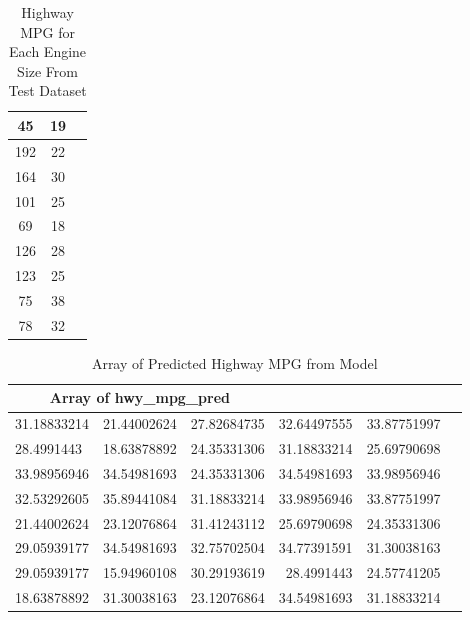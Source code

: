 \begin{table}[htb]
\begin{tabular}{|c|c| p{5cm}|}
     45  & 19 \\ \hline
     192 & 22 \\ \hline
     164 & 30 \\ \hline
     101 & 25 \\ \hline
     69  & 18 \\ \hline
     126 & 28 \\ \hline
     123 & 25 \\ \hline
     75  & 38 \\ \hline
     78  & 32 \\ \hline
   \end{tabular}  
   \caption{Highway MPG for Each Engine Size From Test Dataset} 
   \label{tab:TestSetMPG}
\end{table}


\begin{table}[htb]
    \centering
    \begin{tabular}{llcrr p{8cm}}
    \hline
    \midrule
    \multicolumn{3}{c}{Array of hwy\_mpg\_pred}\\ \hline
  31.18833214 & 21.44002624 & 27.82684735 & 32.64497555 &  33.87751997 \\						
  28.4991443  &  18.63878892 & 24.35331306 & 31.18833214 & 25.69790698 \\						
  33.98956946 & 34.54981693 & 24.35331306 &  34.54981693 & 33.98956946 \\						
  32.53292605 & 35.89441084 & 31.18833214 &  33.98956946 & 33.87751997 \\						
  21.44002624 & 23.12076864 & 31.41243112 & 25.69790698 & 24.35331306 \\						
  29.05939177 & 34.54981693 & 32.75702504 & 34.77391591 & 31.30038163 \\						
  29.05939177 & 15.94960108 & 30.29193619 & 28.4991443  & 24.57741205 \\						
  18.63878892 & 31.30038163 & 23.12076864 & 34.54981693 & 31.18833214 \\
  \hline
  \midrule
    \end{tabular}
    \caption{Array of Predicted Highway MPG from  Model}
    \label{tab:PredMPG}
\end{table}




